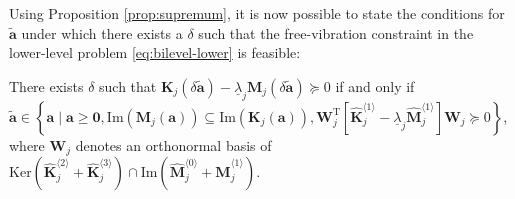 \documentclass[final,onefignum,onetabnum]{siamart220329}
\newtheorem{remark}{Remark}
\begin{document}

Using Proposition \ref{prop:supremum}, it is now possible to state the conditions for $\tilde{\mathbf{a}}$ under which there exists a $\delta$ such that the free-vibration constraint in the lower-level problem \eqref{eq:bilevel-lower} is feasible:
%
\begin{proposition}\label{prop:scaling}
	There exists $\delta$ such that $\mathbf{K}_j(\delta \tilde{\mathbf{a}}) - \underline{\lambda}_j \mathbf{M}_j(\delta \tilde{\mathbf{a}}) \succeq 0$ if and only if $\tilde{\mathbf{a}} \in \left\{\mathbf{a} \;\vert\; \mathbf{a}\ge \mathbf{0}, \mathrm{Im}\left(\mathbf{M}_j(\mathbf{a})\right) \subseteq \mathrm{Im}\left(\mathbf{K}_j(\mathbf{a})\right),\mathbf{W}_j^\mathrm{T}\left[\hat{\mathbf{K}}_{j}^{\langle 1\rangle} - \underline{\lambda}_j \hat{\mathbf{M}}_{j}^{\langle 1\rangle} \right]\mathbf{W}_j \succeq 0\right\}$, where $\mathbf{W}_j$ denotes an orthonormal basis of $\mathrm{Ker}\left(\hat{\mathbf{K}}_j^{\langle 2\rangle} + \hat{\mathbf{K}}_j^{\langle 3\rangle}\right) \cap \mathrm{Im}\left(\hat{\mathbf{M}}_j^{\langle 0\rangle} + \hat{\mathbf{M}}_j^{\langle 1\rangle}\right)$.
\end{proposition}
\end{document}

